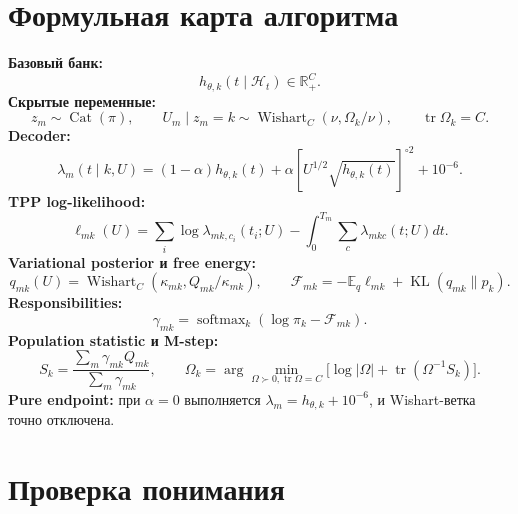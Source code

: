 \documentclass[12pt,a4paper]{article}
\DeclareMathOperator{\tr}{tr}
\DeclareMathOperator{\softmax}{softmax}
\DeclareMathOperator{\Cat}{Cat}
\DeclareMathOperator{\Wishart}{Wishart}
\DeclareMathOperator{\KL}{KL}
\newcommand{\E}{\mathbb{E}}
\newcommand{\R}{\mathbb{R}}
\newcommand{\History}{\mathcal{H}}
\newenvironment{summarybox}{\par\medskip\noindent{\color{navy}\bfseries Короткий итог. }\ignorespaces}{\par\medskip}
\begin{document}
\section{Формульная карта алгоритма}

\begin{summarybox}
\textbf{Базовый банк:}
\begin{equation*}
h_{\theta,k}(t\mid\History_t)\in\R_+^C.
\end{equation*}
\textbf{Скрытые переменные:}
\begin{equation*}
z_m\sim\Cat(\pi),\qquad U_m\mid z_m=k\sim\Wishart_C(\nu,\Omega_k/\nu),\qquad \tr\Omega_k=C.
\end{equation*}
\textbf{Decoder:}
\begin{equation*}
\lambda_m(t\mid k,U)=(1-\alpha)h_{\theta,k}(t)+\alpha\left[U^{1/2}\sqrt{h_{\theta,k}(t)}\right]^{\circ2}+10^{-6}.
\end{equation*}
\textbf{TPP log-likelihood:}
\begin{equation*}
\ell_{mk}(U)=\sum_i\log\lambda_{mk,c_i}(t_i;U)-\int_0^{T_m}\sum_c\lambda_{mkc}(t;U)dt.
\end{equation*}
\textbf{Variational posterior и free energy:}
\begin{equation*}
q_{mk}(U)=\Wishart_C(\kappa_{mk},Q_{mk}/\kappa_{mk}),\qquad \mathcal F_{mk}=-\E_q\ell_{mk}+\KL(q_{mk}\|p_k).
\end{equation*}
\textbf{Responsibilities:}
\begin{equation*}
\gamma_{mk}=\softmax_k(\log\pi_k-\mathcal F_{mk}).
\end{equation*}
\textbf{Population statistic и M-step:}
\begin{equation*}
S_k=\frac{\sum_m\gamma_{mk}Q_{mk}}{\sum_m\gamma_{mk}},\qquad \Omega_k=\arg\min_{\Omega\succ0,\tr\Omega=C}\bigl[\log|\Omega|+\tr(\Omega^{-1}S_k)\bigr].
\end{equation*}
\textbf{Pure endpoint:} при \(\alpha=0\) выполняется \(\lambda_m=h_{\theta,k}+10^{-6}\), и Wishart-ветка точно отключена.
\end{summarybox}

\section{Проверка понимания}
\end{document}
